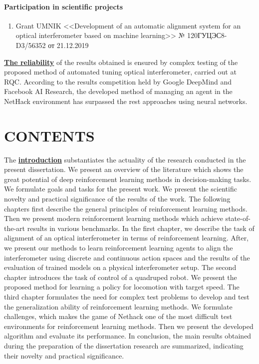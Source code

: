 \paragraph{Participation in scientific projects}
\begin{enumerate}[labelindent=3pt, labelsep=10pt, topsep=10pt, itemsep=5pt]
    \item Grant UMNIK <<Development of an automatic alignment system for an optical interferometer based on machine learning>> № 120ГУЦЭС8-D3/56352 от 21.12.2019

\end{enumerate}


\underline{\textbf{The reliability}} of the results obtained is ensured by complex testing of the proposed method of automated tuning optical interferometer, carried out at RQC. According to the results competition held by Google DeepMind and Facebook AI Research, the developed method of managing an agent in the NetHack environment has surpassed the rest approaches using neural networks.


\section*{\centering CONTENTS}
The \underline{\textbf{introduction}} substantiates the actuality of the research conducted in the present dissertation. We present an overview of the literature which shows the great potential of deep reinforcement learning methods in decision-making tasks. We formulate goals and tasks for the present work. We present the scientific novelty and practical significance of the results of the work. The following chapters first describe the general principles of reinforcement learning methods. Then we present modern reinforcement learning methods which achieve state-of-the-art results in various benchmarks. In the first chapter, we describe the task of alignment of an optical interferometer in terms of reinforcement learning. After, we present our methods to learn reinforcement learning agents to align the interferometer using discrete and continuous action spaces and the results of the evaluation of trained models on a physical interferometer setup. The second chapter introduces the task of control of a quadruped robot. We present the proposed method for learning a policy for locomotion with target speed. The third chapter formulates the need for complex test problems to develop and test the generalization ability of reinforcement learning methods. We formulate challenges, which makes the game of Nethack one of the most difficult test environments for reinforcement learning methods. Then we present the developed algorithm and evaluate its performance. In conclusion, the main results obtained during the preparation of the dissertation research are summarized, indicating their novelty and practical significance.


